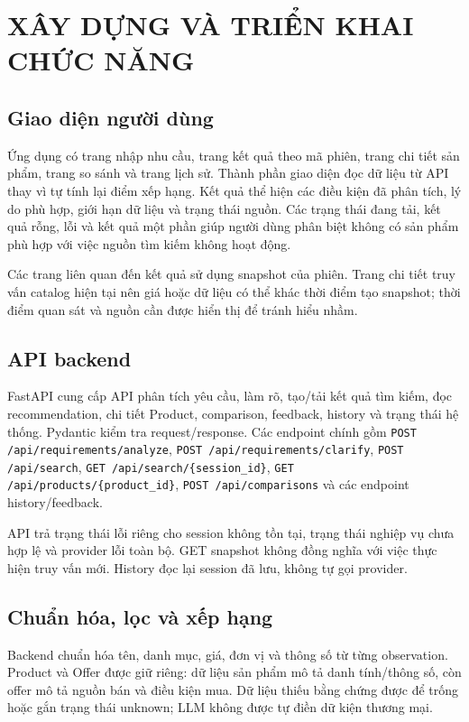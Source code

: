 \chapter{XÂY DỰNG VÀ TRIỂN KHAI CHỨC NĂNG}

\section{Giao diện người dùng}

Ứng dụng có trang nhập nhu cầu, trang kết quả theo mã phiên, trang chi tiết sản phẩm, trang so sánh và trang lịch sử. Thành phần giao diện đọc dữ liệu từ API thay vì tự tính lại điểm xếp hạng. Kết quả thể hiện các điều kiện đã phân tích, lý do phù hợp, giới hạn dữ liệu và trạng thái nguồn. Các trạng thái đang tải, kết quả rỗng, lỗi và kết quả một phần giúp người dùng phân biệt không có sản phẩm phù hợp với việc nguồn tìm kiếm không hoạt động.

Các trang liên quan đến kết quả sử dụng snapshot của phiên. Trang chi tiết truy vấn catalog hiện tại nên giá hoặc dữ liệu có thể khác thời điểm tạo snapshot; thời điểm quan sát và nguồn cần được hiển thị để tránh hiểu nhầm.

\section{API backend}

FastAPI cung cấp API phân tích yêu cầu, làm rõ, tạo/tải kết quả tìm kiếm, đọc recommendation, chi tiết Product, comparison, feedback, history và trạng thái hệ thống. Pydantic kiểm tra request/response. Các endpoint chính gồm \texttt{POST /api/requirements/analyze}, \texttt{POST /api/requirements/clarify}, \texttt{POST /api/search}, \texttt{GET /api/search/\{session\_id\}}, \texttt{GET /api/products/\{product\_id\}}, \texttt{POST /api/comparisons} và các endpoint history/feedback.

API trả trạng thái lỗi riêng cho session không tồn tại, trạng thái nghiệp vụ chưa hợp lệ và provider lỗi toàn bộ. GET snapshot không đồng nghĩa với việc thực hiện truy vấn mới. History đọc lại session đã lưu, không tự gọi provider.

\section{Chuẩn hóa, lọc và xếp hạng}

Backend chuẩn hóa tên, danh mục, giá, đơn vị và thông số từ từng observation. Product và Offer được giữ riêng: dữ liệu sản phẩm mô tả danh tính/thông số, còn offer mô tả nguồn bán và điều kiện mua. Dữ liệu thiếu bằng chứng được để trống hoặc gắn trạng thái unknown; LLM không được tự điền dữ kiện thương mại.

